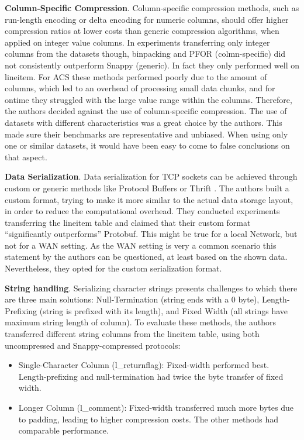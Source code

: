 \documentclass[sigconf]{acmart}
\begin{document}
\textbf{Column-Specific Compression}.
Column-specific compression methods, such as run-length encoding or delta encoding for numeric columns, should offer higher compression ratios at lower costs than generic compression algorithms, when applied on integer value columns. In experiments transferring only integer columns from the datasets though, binpacking and PFOR \cite{lemire2012decoding} (colmn-specific) did not consistently outperform Snappy (generic). In fact they only performed well on lineitem. For ACS these methods performed poorly due to the amount of columns, which led to an overhead of processing small data chunks, and for ontime they struggled with the large value range within the columns. Therefore, the authors decided against the use of column-specific compression. 
The use of datasets with different characteristics was a great choice by the authors. This made sure their benchmarks are representative and unbiased. When using only one or similar datasets, it would have been easy to come to false conclusions on that aspect.

\textbf{Data Serialization}.
Data serialization for TCP sockets can be achieved through custom or generic methods like Protocol Buffers \cite{protobuf2016developers} or Thrift \cite{prunicki2009apache}. The authors built a custom format, trying to make it more similar to the actual data storage layout, in order to reduce the computational overhead.
They conducted experiments transferring the lineitem table and claimed that their custom format “significantly outperforms” Protobuf. This might be true for a local Network, but not for a WAN setting. As the WAN setting is very a common scenario this statement by the authors can be questioned, at least based on the shown data. Nevertheless, they opted for the custom serialization format.

\textbf{String handling}.
Serializing character strings presents challenges to which there are three main solutions: Null-Termination (string ends with a 0 byte), Length-Prefixing (string is prefixed with its length), and Fixed Width (all strings have maximum string length of column). To evaluate these methods, the authors transferred different string columns from the lineitem table, using both uncompressed and Snappy-compressed protocols:
\begin{itemize}
    \item Single-Character Column (l\_returnflag): Fixed-width performed best. Length-prefixing and null-termination had twice the byte transfer of fixed width.
    \item Longer Column (l\_comment): Fixed-width transferred much more bytes due to padding, leading to higher compression costs. The other methods had comparable performance.
\end{itemize}
\end{document}
